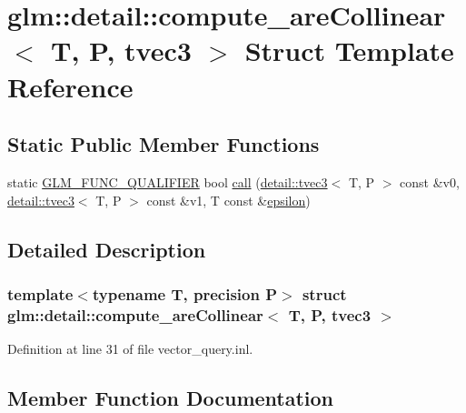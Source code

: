 \hypertarget{structglm_1_1detail_1_1compute__are_collinear_3_01_t_00_01_p_00_01tvec3_01_4}{}\section{glm\+:\+:detail\+:\+:compute\+\_\+are\+Collinear$<$ T, P, tvec3 $>$ Struct Template Reference}
\label{structglm_1_1detail_1_1compute__are_collinear_3_01_t_00_01_p_00_01tvec3_01_4}
\subsection*{Static Public Member Functions}
\begin{DoxyCompactItemize}
\item 
static \hyperlink{setup_8hpp_a33fdea6f91c5f834105f7415e2a64407}{G\+L\+M\+\_\+\+F\+U\+N\+C\+\_\+\+Q\+U\+A\+L\+I\+F\+I\+ER} bool \hyperlink{structglm_1_1detail_1_1compute__are_collinear_3_01_t_00_01_p_00_01tvec3_01_4_a1b9e023b1518128243ec6cc5748faccc}{call} (\hyperlink{structglm_1_1detail_1_1tvec3}{detail\+::tvec3}$<$ T, P $>$ const \&v0, \hyperlink{structglm_1_1detail_1_1tvec3}{detail\+::tvec3}$<$ T, P $>$ const \&v1, T const \&\hyperlink{group__gtc__constants_gacb41049b8d22c8aa90e362b96c524feb}{epsilon})
\end{DoxyCompactItemize}


\subsection{Detailed Description}
\subsubsection*{template$<$typename T, precision P$>$\newline
struct glm\+::detail\+::compute\+\_\+are\+Collinear$<$ T, P, tvec3 $>$}



Definition at line 31 of file vector\+\_\+query.\+inl.



\subsection{Member Function Documentation}
\mbox{\label{structglm_1_1detail_1_1compute__are_collinear_3_01_t_00_01_p_00_01tvec3_01_4_a1b9e023b1518128243ec6cc5748faccc}} 
